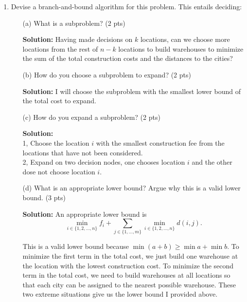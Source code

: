 \documentclass{article}
\begin{document}
\begin{enumerate}
	\item Devise a branch-and-bound algorithm for this problem.
	This entails deciding:
	\begin{itemize}
		\item[(a)] What is a subproblem? (2 pts)
\begin{tcolorbox}
\textbf{Solution:} Having made decisions on $k$ locations, can we choose more locations from the rest of $n-k$ locations to build warehouses to minimize the sum of the total construction costs and the distances to the cities?
\end{tcolorbox}
		\item[(b)] How do you choose a subproblem to expand? (2 pts)
\begin{tcolorbox}
\textbf{Solution:} I will choose the subproblem with the smallest lower bound of the total cost to expand. 
\end{tcolorbox}
		\item[(c)] How do you expand a subproblem? (2 pts)
\begin{tcolorbox}
\textbf{Solution:} \\
1, Choose the location $i$ with the smallest construction fee from the locations that have not been considered. \\

2, Expand on two decision nodes, one chooses location $i$ and the other dose not choose location $i$. 

\end{tcolorbox}
		\item[(d)] What is an appropriate lower bound? Argue why this is a valid lower bound. (3 pts)
\begin{tcolorbox}
\textbf{Solution:} An appropriate lower bound is $$\min_{i \in \{1,2, ..., n\}} f_i + \sum_{j\in\{1,\dots,m\}}{\min_{i\in \{1,2, ..., n\}}{d(i,j)}}.$$

This is a valid lower bound because $\min(a + b) \geq \min a + \min b$.  To minimize the first term in the total cost, we just build one warehouse at the location with the lowest construction cost. To minimize the second term in the total cost, we need to build warehouses at all locations so that each city can be assigned to the nearest possible warehouse. These two extreme situations give us the lower bound I provided above. 
\end{tcolorbox}


\end{itemize}
\end{enumerate}
\end{document}
